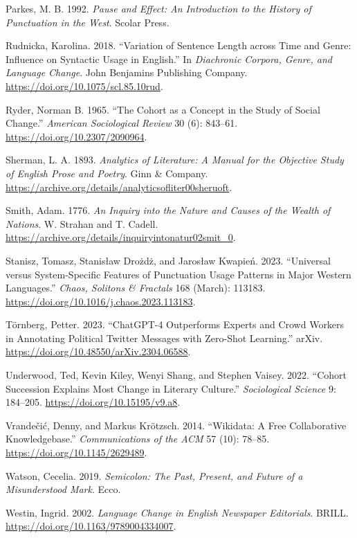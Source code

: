 \documentclass[
  11pt,
]{article}
\newlength{\cslhangindent}
\newenvironment{CSLReferences}[2] %
 {\begin{list}{}{%
  \setlength{\itemindent}{0pt}
  \setlength{\leftmargin}{0pt}
  \setlength{\parsep}{0pt}
  \ifodd #1
   \setlength{\leftmargin}{\cslhangindent}
   \setlength{\itemindent}{-1\cslhangindent}
  \fi
  \setlength{\itemsep}{#2\baselineskip}}}
 {\end{list}}
\begin{document}
\begin{CSLReferences}{1}{1}
Parkes, M. B. 1992. \emph{Pause and Effect: An Introduction to the History of Punctuation in the West}. Scolar Press.

Rudnicka, Karolina. 2018. {``Variation of Sentence Length across Time and Genre: Influence on Syntactic Usage in English.''} In \emph{Diachronic Corpora, Genre, and Language Change}. John Benjamins
Publishing Company. \url{https://doi.org/10.1075/scl.85.10rud}.

Ryder, Norman B. 1965. {``The Cohort as a Concept in the Study of Social Change.''} \emph{American Sociological Review} 30 (6): 843--61. \url{https://doi.org/10.2307/2090964}.

Sherman, L. A. 1893. \emph{Analytics of Literature: A Manual for the Objective Study of English Prose and Poetry}. Ginn \& Company. \url{https://archive.org/details/analyticsofliter00sheruoft}.

Smith, Adam. 1776. \emph{An Inquiry into the Nature and Causes of the Wealth of Nations}. {W. Strahan and T. Cadell}. \url{https://archive.org/details/inquiryintonatur02smit_0}.

Stanisz, Tomasz, Stanisław Drożdż, and Jarosław Kwapień. 2023. {``Universal versus System-Specific Features of Punctuation Usage Patterns in Major Western Languages.''} \emph{Chaos, Solitons \&
Fractals} 168 (March): 113183. \url{https://doi.org/10.1016/j.chaos.2023.113183}.

Törnberg, Petter. 2023. {``{ChatGPT-4} Outperforms Experts and Crowd Workers in Annotating Political {Twitter} Messages with Zero-Shot Learning.''} arXiv.
\url{https://doi.org/10.48550/arXiv.2304.06588}.

Underwood, Ted, Kevin Kiley, Wenyi Shang, and Stephen Vaisey. 2022. {``Cohort Succession Explains Most Change in Literary Culture.''} \emph{Sociological Science} 9: 184--205.
\url{https://doi.org/10.15195/v9.a8}.

Vrandečić, Denny, and Markus Krötzsch. 2014. {``Wikidata: A Free Collaborative Knowledgebase.''} \emph{Communications of the ACM} 57 (10): 78--85. \url{https://doi.org/10.1145/2629489}.

Watson, Cecelia. 2019. \emph{Semicolon: The Past, Present, and Future of a Misunderstood Mark}. Ecco.

Westin, Ingrid. 2002. \emph{Language Change in English Newspaper Editorials}. BRILL. \url{https://doi.org/10.1163/9789004334007}.

\end{CSLReferences}
\end{document}

